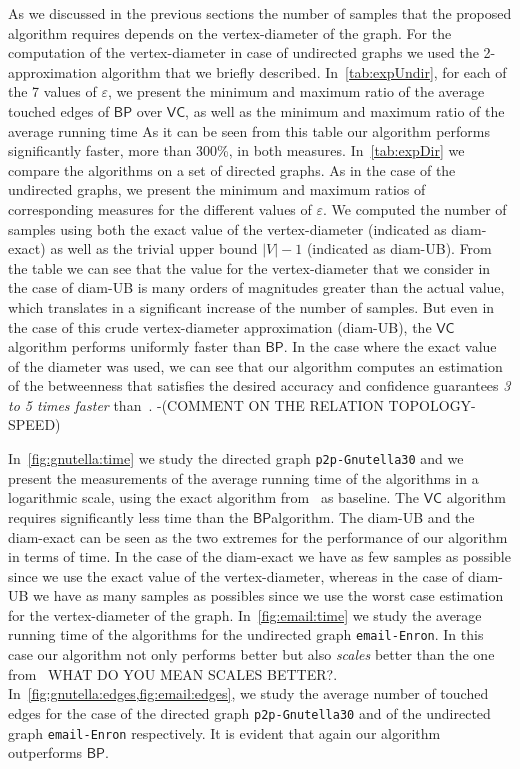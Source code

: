 As we discussed in the previous sections the number of samples that the proposed
algorithm requires depends on the vertex-diameter of the graph. For the computation of
the vertex-diameter in case of undirected graphs we used the 2-approximation
algorithm that we briefly described. In~\cref{tab:expUndir}, for each of
the 7 values of $\varepsilon$, we present the minimum and maximum ratio of the
average touched edges of $\mathsf{BP}$ over $\mathsf{VC}$, as well as the
minimum and maximum ratio of the average running time %
As it can be seen from this table our algorithm performs significantly faster,
more than 300\%, in both measures. In~\cref{tab:expDir} we compare the
algorithms on a set of directed graphs. As in the case of the undirected graphs,
we present the minimum and maximum ratios of corresponding measures for the
different values of $\varepsilon$. We computed the number of samples using both
the exact value of the vertex-diameter (indicated as diam-exact) as well as the
trivial upper bound $|V|-1$ (indicated as diam-UB). From the table we can see
that the value for the vertex-diameter that we consider in the case of diam-UB
is many orders of magnitudes greater than the actual value, which translates in
a significant increase of the number of samples. But even in the case of this
crude vertex-diameter approximation (diam-UB), the $\mathsf{VC}$ algorithm
performs uniformly faster than $\mathsf{BP}$. In the case where the exact value
of the diameter was used, we can see that our algorithm computes an estimation
of the betweenness that satisfies the desired accuracy and confidence guarantees
\emph{3 to 5 times faster} than~\citep{BrandesP07}. \XXX-(COMMENT ON THE
RELATION TOPOLOGY-SPEED) 

In~\cref{fig:gnutella:time} we study the directed graph \texttt{p2p-Gnutella30}
and we present the measurements of the average running time of the algorithms in
a logarithmic scale, using the exact algorithm from~\citep{Brandes01} as
baseline. The $\mathsf{VC}$ algorithm requires significantly less time
than the $\mathsf{BP}$algorithm. The diam-UB and the diam-exact can be seen as
the two extremes for the performance of our algorithm in terms of time. In the
case of the diam-exact we have as few samples as possible since we use the exact
value of the vertex-diameter, whereas in the case of diam-UB we have as many
samples as possibles since we use the worst case estimation for the
vertex-diameter of the graph. 
In~\cref{fig:email:time} we study the average running time of the algorithms for
the undirected graph \texttt{email-Enron}. In this case our algorithm not only
performs better but also \emph{scales} better than the one
from~\citep{BrandesP07} \XXX WHAT DO YOU MEAN SCALES BETTER?. 
In~\cref{fig:gnutella:edges,fig:email:edges}, we study the average number of
touched edges for the case of the directed graph \texttt{p2p-Gnutella30} and of
the undirected graph \texttt{email-Enron} respectively. It is evident that again
our algorithm outperforms $\mathsf{BP}$. 


